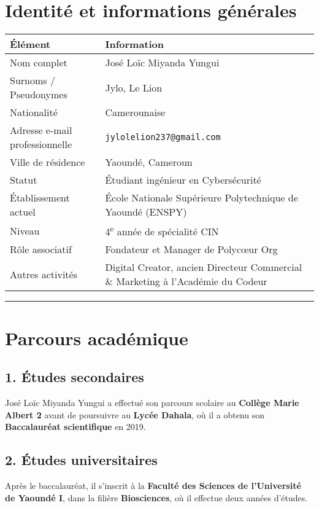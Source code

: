 \documentclass[12pt]{article}
\begin{document}
\section*{Identité et informations générales}

\begin{center}
\begin{tabular}{|p{6cm}|p{8cm}|}
\hline
\textbf{Élément} & \textbf{Information} \\
\hline
Nom complet & José Loïc Miyanda Yungui \\
\hline
Surnoms / Pseudonymes & Jylo, Le Lion \\
\hline
Nationalité & Camerounaise \\
\hline
Adresse e-mail professionnelle & \texttt{jylolelion237@gmail.com} \\
\hline
Ville de résidence & Yaoundé, Cameroun \\
\hline
Statut & Étudiant ingénieur en Cybersécurité \\
\hline
Établissement actuel & École Nationale Supérieure Polytechnique de Yaoundé (ENSPY) \\
\hline
Niveau & 4\textsuperscript{e} année de spécialité CIN \\
\hline
Rôle associatif & Fondateur et Manager de Polycœur Org \\
\hline
Autres activités & Digital Creator, ancien Directeur Commercial \& Marketing à l’Académie du Codeur \\
\hline
\end{tabular}
\end{center}

\vspace{0.5cm}
\hrule
\vspace{0.5cm}

\section*{Parcours académique}

\subsection*{1. Études secondaires}
José Loïc Miyanda Yungui a effectué son parcours scolaire au \textbf{Collège Marie Albert 2} avant de poursuivre au \textbf{Lycée Dahala}, où il a obtenu son \textbf{Baccalauréat scientifique} en 2019.

\subsection*{2. Études universitaires}
Après le baccalauréat, il s’inscrit à la \textbf{Faculté des Sciences de l’Université de Yaoundé I}, dans la filière \textbf{Biosciences}, où il effectue deux années d’études.
\end{document}
